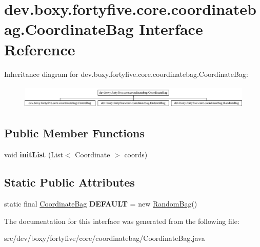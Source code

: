 \hypertarget{interfacedev_1_1boxy_1_1fortyfive_1_1core_1_1coordinatebag_1_1_coordinate_bag}{
\section{dev.boxy.fortyfive.core.coordinatebag.CoordinateBag Interface Reference}
\label{d3/ddb/interfacedev_1_1boxy_1_1fortyfive_1_1core_1_1coordinatebag_1_1_coordinate_bag}
}
Inheritance diagram for dev.boxy.fortyfive.core.coordinatebag.CoordinateBag:\begin{figure}[H]
\begin{center}
\leavevmode
\includegraphics[height=1.145194cm]{d3/ddb/interfacedev_1_1boxy_1_1fortyfive_1_1core_1_1coordinatebag_1_1_coordinate_bag}
\end{center}
\end{figure}
\subsection*{Public Member Functions}
\begin{DoxyCompactItemize}
\item 
\hypertarget{interfacedev_1_1boxy_1_1fortyfive_1_1core_1_1coordinatebag_1_1_coordinate_bag_af8c7041bdd935a041430564359eff79d}{
void {\bfseries initList} (List$<$ Coordinate $>$ coords)}
\label{d3/ddb/interfacedev_1_1boxy_1_1fortyfive_1_1core_1_1coordinatebag_1_1_coordinate_bag_af8c7041bdd935a041430564359eff79d}

\end{DoxyCompactItemize}
\subsection*{Static Public Attributes}
\begin{DoxyCompactItemize}
\item 
\hypertarget{interfacedev_1_1boxy_1_1fortyfive_1_1core_1_1coordinatebag_1_1_coordinate_bag_a30fd1be601b5bf2aa53054c74c6b727c}{
static final \hyperlink{interfacedev_1_1boxy_1_1fortyfive_1_1core_1_1coordinatebag_1_1_coordinate_bag}{CoordinateBag} {\bfseries DEFAULT} = new \hyperlink{classdev_1_1boxy_1_1fortyfive_1_1core_1_1coordinatebag_1_1_random_bag}{RandomBag}()}
\label{d3/ddb/interfacedev_1_1boxy_1_1fortyfive_1_1core_1_1coordinatebag_1_1_coordinate_bag_a30fd1be601b5bf2aa53054c74c6b727c}

\end{DoxyCompactItemize}


The documentation for this interface was generated from the following file:\begin{DoxyCompactItemize}
\item 
src/dev/boxy/fortyfive/core/coordinatebag/CoordinateBag.java\end{DoxyCompactItemize}
